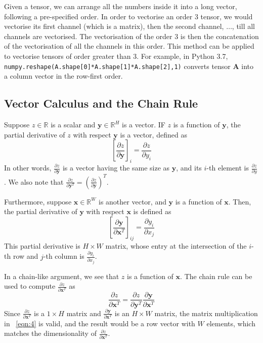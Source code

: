\documentclass[12pt]{report}
\numberwithin{equation}{section}
\begin{document}
Given a tensor, we can arrange all the numbers inside it into a long vector, following a pre-specified order. In order to vectorise an order 3 tensor, we would vectorise its first channel (which is a matrix), then the second channel, $\hdots$,  till all channels are vectorised. The vectorisation of the order 3 is then the concatenation of the vectorisation of all the channels in this order. This method can be applied to vectorise tensors of order greater than 3. For example, in Python 3.7,  \texttt{numpy.reshape(A.shape[0]*A.shape[1]*A.shape[2],1)} converts  tensor $\bm{A}$ into a column vector in the row-first order. 

\subsection{Vector Calculus and the Chain Rule}
Suppose $z \in \mathbb{R}$ is a scalar and $\bm{y} \in \mathbb{R}^H$ is a vector. IF $z$ is a function of $\bm{y}$, the partial derivative of $z$ with respect $\bm{y}$ is a vector, defined as 
\begin{equation}\label{eqn:2}
{\left[\dfrac{\partial z}{\partial \bm{y}}\right]}_i = \dfrac{\partial z}{\partial y_i}
\end{equation} 
In other words, $\frac{\partial z}{\partial \bm{y}}$ is a vector having the same size as $\bm{y}$, and its $i$-th element is $\frac{\partial z}{\partial y}$. We also note that $\frac{\partial z}{\partial \bm{y}^T} = (\frac{\partial z}{\partial \bm{y}})^T$.

Furthermore, suppose $\bm{x}\in \mathbb{R}^W$ is another vector, and $\bm{y}$ is a function of $\bm{x}$. Then, the partial derivative of $\bm{y}$ with respect $\bm{x}$ is defined as
\begin{equation}\label{eqn:3}
{\left[\dfrac{\partial \bm{y}}{\partial \bm{x}^T}\right]}_{ij} = \dfrac{\partial y_i}{\partial x_j}
\end{equation} 
This partial derivative is $H \times W$ matrix, whose entry at the intersection of the $i$-th row and $j$-th column is $\frac{\partial y_i}{\partial x_j}$.

In a chain-like argument, we see that $z$ is a function of $\bm{x}$. The chain rule can be used to compute $\frac{\partial z}{\partial \bm{x}^T}$ as 
\begin{equation}\label{eqn:4}
\dfrac{\partial z}{\partial \bm{x}^T} = \dfrac{\partial z}{\partial \bm{y}^T} \dfrac{\partial \bm{y}}{\partial \bm{x}^T}
\end{equation}
Since $\frac{\partial z}{\partial \bm{x}^T}$ is a $1\times H$ matrix and $\frac{\partial \bm{y}}{\partial \bm{x}^T}$ is an $H \times W$ matrix, the matrix multiplication in ~\eqref{eqn:4} is valid, and the result would be a row vector with $W$ elements, which matches the dimensionality of $\frac{\partial z}{\partial \bm{x}^T}$.
\end{document}
